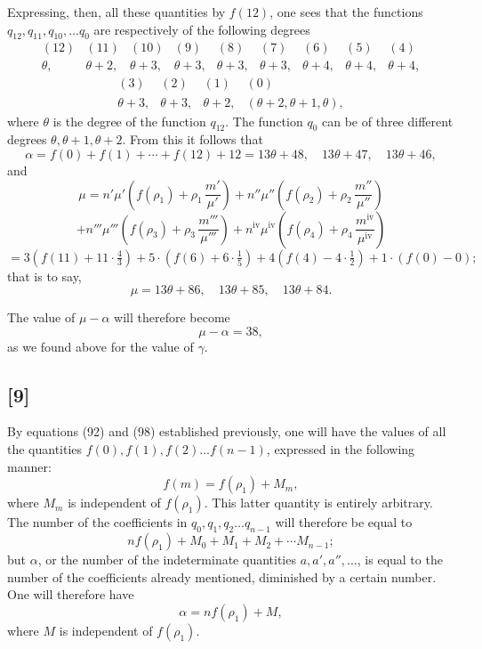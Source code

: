 \documentclass{article}
\begin{document}
Expressing, then, all these quantities by $f(12)$, one sees that the functions $q_{12}, q_{11}, q_{10}, \ldots q_0$ are respectively of the following degrees
\[ \begin{array}{ccccccccc} (12) & (11) & (10) & (9) & (8) & (7) & (6) & (5) & (4) \\ \theta, & \theta+2, & \theta+3, & \theta+3, & \theta+3, & \theta+3, & \theta+4, & \theta+4, & \theta+4, \end{array} \]
\[ \begin{array}{cccc} (3) & (2) & (1) & (0) \\ \theta+3, & \theta+3, & \theta+2, & (\theta+2, \theta+1, \theta), \end{array} \]
where $\theta$ is the degree of the function $q_{12}$. The function $q_0$ can be of three different degrees $\theta, \theta+1, \theta+2$.
From this it follows that
\[ \alpha = f(0)+f(1)+\cdots+f(12)+12 = 13\theta+48, \quad 13\theta+47, \quad 13\theta+46, \]
and
\[ \mu = n'\mu'\left(f(\rho_1)+\rho_1\,\frac{m'}{\mu'}\right) + n''\mu''\left(f(\rho_2)+\rho_2\,\frac{m''}{\mu''}\right) \]
\[ + n'''\mu'''\left(f(\rho_3)+\rho_3\,\frac{m'''}{\mu'''}\right) + n^{\text{iv}}\mu^{\text{iv}}\left(f(\rho_4)+\rho_4\,\frac{m^{\text{iv}}}{\mu^{\text{iv}}}\right) \]
\[ = 3\left(f(11)+11 \cdot \tfrac{4}{3}\right) + 5 \cdot \left(f(6)+6 \cdot \tfrac{1}{5}\right) + 4\left(f(4)-4 \cdot \tfrac{1}{2}\right) + 1 \cdot \left(f(0)-0\right); \]
that is to say,
\[ \mu = 13\theta+86, \quad 13\theta+85, \quad 13\theta+84. \]

The value of $\mu-\alpha$ will therefore become
\[ \mu-\alpha = 38, \]
as we found above for the value of $\gamma$.

\subsection*{[9]}

By equations (92) and (98) established previously, one will have the values of all the quantities $f(0), f(1), f(2) \ldots f(n-1)$, expressed in the following manner:
\[ f(m) = f(\rho_1) + M_m, \tag{108} \]
where $M_m$ is independent of $f(\rho_1)$. This latter quantity is entirely arbitrary. The number of the coefficients in $q_0, q_1, q_2 \ldots q_{n-1}$ will therefore be equal to
\[ nf(\rho_1) + M_0+M_1+M_2+\cdots M_{n-1}; \tag{109} \]
but $\alpha$, or the number of the indeterminate quantities $a, a', a'', \ldots$,
is equal to the number of the coefficients already mentioned, diminished by a certain number. One will therefore have
\[ \alpha = nf(\rho_1) + M, \tag{110} \]
where $M$ is independent of $f(\rho_1)$.
\end{document}
